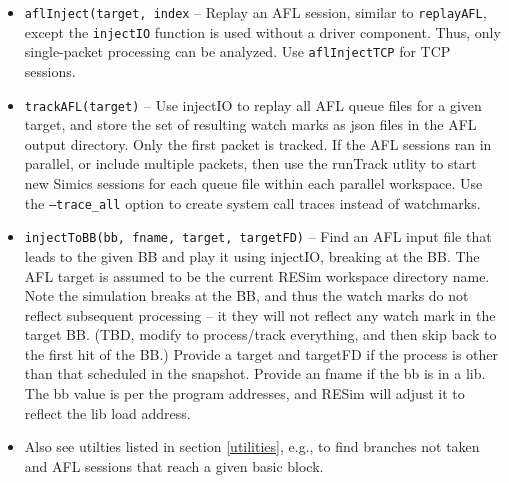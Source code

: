 \documentclass[titlepage]{article}
\begin{document}
\begin{itemize}
\item{\tt aflInject(target, index} -- Replay an AFL session, similar to {\tt replayAFL}, except the {\tt injectIO} function is used without
a driver component.  Thus, only single-packet processing can be analyzed.  Use {\tt aflInjectTCP} for TCP sessions.

\item{\tt trackAFL(target)} -- Use injectIO to replay all AFL queue files for a given target, and store the set of resulting watch marks as json files
in the AFL output directory.  Only the first packet is tracked.  If the AFL sessions ran in parallel, or include multiple packets, then use the runTrack utlity to 
start new Simics sessions for each queue file within each parallel workspace.  Use the {\tt --trace\_all} option to create system call traces instead of watchmarks.  

\item{\tt injectToBB(bb, fname, target, targetFD)} -- Find an AFL input file that leads to the given BB and play it using injectIO, breaking at the BB.  The AFL target
is assumed to be the current RESim workspace directory name.  Note the simulation breaks at the BB, and thus the watch marks do not reflect subsequent
processing -- it they will not reflect any watch mark in the target BB. (TBD, modify to process/track everything, and then skip back to the first hit of the BB.)
Provide a target and targetFD if the process is other than that scheduled in the snapshot.  Provide an fname if the bb is in a lib.  The bb value is per the program addresses, and RESim will adjust it to reflect the lib load address.

\item Also see utilties listed in section \ref{utilities}, e.g., to find branches not taken and AFL sessions that reach a given basic block.

\end{itemize}
\end{document}
